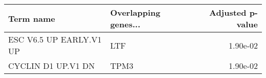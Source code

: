 \begin{tabular}{llr}
\toprule
              Term name & Overlapping genes... &  Adjusted p-value \\
\midrule
ESC V6.5 UP EARLY.V1 UP &                  LTF &          1.90e-02 \\
     CYCLIN D1 UP.V1 DN &                 TPM3 &          1.90e-02 \\
\bottomrule
\end{tabular}
